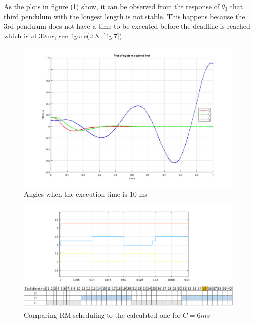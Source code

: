\documentclass[a4paper,12pt,oneside,onecolumn]{article} %
\begin{document}
As the plots in figure (\ref{fig:5}) show, it can be observed from the response of $\theta_3$ that third pendulum with the longest length is not stable. This happens because the 3rd pendulum does not have a time to be executed before the deadline is reached which is at 39ms, see figure(\ref{fig:6} $\&$ \ref{fig:7}). 


\begin{figure}[H]
    \centering
    \includegraphics[scale=0.3]{theta10.jpg}
    \caption{Angles when the execution time is 10 ms}
    \label{fig:5}
\end{figure}

\begin{figure}[H]
    \centering
    \includegraphics[scale=0.7]{Task_05.png}
    \caption{Comparing RM scheduling to the calculated one for $C=6ms$}
    \label{fig:6}
\end{figure}
\end{document}
